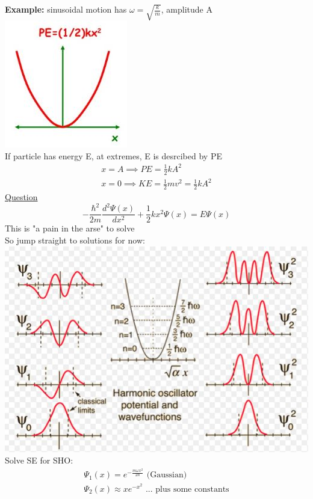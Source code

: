 \documentclass[a4paper, 11pt, fleqn, normalem]{report}
\begin{document}
\textbf{Example: }sinusoidal motion has $\omega = \sqrt{\frac{k}{m}}$, amplitude A \\
\includegraphics{Pote.jpg} \\
If particle has energy E, at extremes, E is desrcibed by PE
\begin{gather*}
    x = A \implies PE = \frac{1}{2}kA^{2} \\
    x = 0 \implies KE = \frac{1}{2}mv^{2} = \frac{1}{2}kA^{2}
\end{gather*}
\underline{Question}
\begin{equation*}
    -\frac{\hbar^{2}}{2m}\frac{d^{2}\Psi(x)}{dx^{2}} + \frac{1}{2}kx^{2}\Psi(x) = E\Psi(x)
\end{equation*}
This is "a pain in the arse" to solve \\
So jump straight to solutions for now: \\
\includegraphics{HarmOsc.jpg} \\
Solve SE for SHO:
\begin{gather*}
    \Psi_{1}(x) = e^{-\tfrac{m\omega x^{2}}{2\hbar}}\text{ (Gaussian)} \\
    \Psi_{2}(x) \approx xe^{-x^{2}}\text{ ... plus some constants}
\end{gather*}
\end{document}
